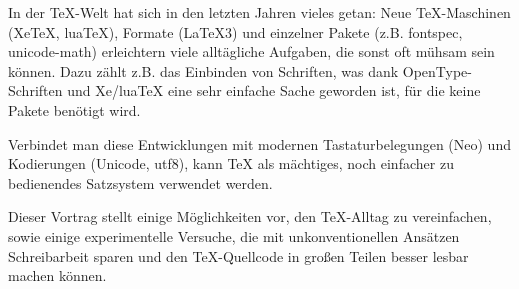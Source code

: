 In der TeX-Welt hat sich in den letzten Jahren vieles getan: Neue TeX-Maschinen (XeTeX, luaTeX), Formate (LaTeX3) und einzelner Pakete (z.B. fontspec, unicode-math) erleichtern viele alltägliche Aufgaben, die sonst oft mühsam sein können. Dazu zählt z.B. das Einbinden von Schriften, was dank OpenType-Schriften und Xe/luaTeX eine sehr einfache Sache geworden ist, für die keine Pakete benötigt wird.

Verbindet man diese Entwicklungen mit modernen Tastaturbelegungen (Neo) und Kodierungen (Unicode, utf8), kann TeX als mächtiges, noch einfacher zu bedienendes Satzsystem verwendet werden.

Dieser Vortrag stellt einige Möglichkeiten vor, den TeX-Alltag zu vereinfachen, sowie einige experimentelle Versuche, die mit unkonventionellen Ansätzen Schreibarbeit sparen und den TeX-Quellcode in großen Teilen besser lesbar machen können.